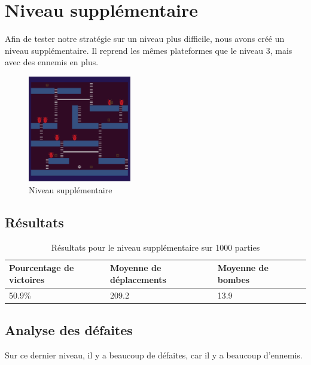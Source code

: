 \newpage

\section{Niveau supplémentaire}

Afin de tester notre stratégie sur un niveau plus difficile, nous avons créé un niveau supplémentaire.
Il reprend les mêmes plateformes que le niveau 3, mais avec des ennemis en plus.

\begin{figure}[!htpb]
    \centering
    \includegraphics[width=0.4\textwidth]{Figures/level4.png}
    \caption{Niveau supplémentaire}
    \label{fig:niveau-supplementaire}
\end{figure}

\subsection{Résultats}

\begin{table}[!htpb]
    \begin{tabularx}{\textwidth}{lXXX}
        \toprule
        Pourcentage de victoires & Moyenne de déplacements & Moyenne de bombes \\
        \midrule
        50.9\% & 209.2 & 13.9 \\
        \bottomrule
    \end{tabularx}
    \caption{Résultats pour le niveau supplémentaire sur 1000 parties}
    \label{tab:res-niveau-supplementaire}
\end{table}

\subsection{Analyse des défaites}

Sur ce dernier niveau, il y a beaucoup de défaites, car il y a beaucoup d'ennemis.

